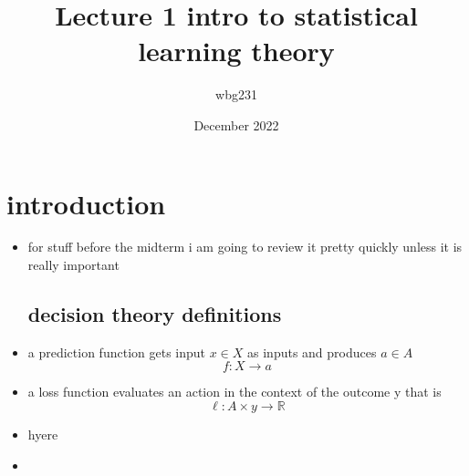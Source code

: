 \documentclass{article}
\title{Lecture 1 intro to statistical learning theory}
\author{wbg231 }
\date{December 2022}
\begin{document}
\maketitle

\section{introduction}
\begin{itemize}
\item for stuff before the midterm i am going to review it pretty quickly unless it is really important 
\subsection*{decision theory definitions}
\item a prediction function gets input $x\in X$ as inputs and produces $a\in A$ $$f:X\rightarrow a$$
\item a loss function evaluates an action in the context of the outcome y that is $$\ell:A\times y\rightarrow \mathbb{R}$$
\item hyere
\item 
\end{itemize}
\end{document}
